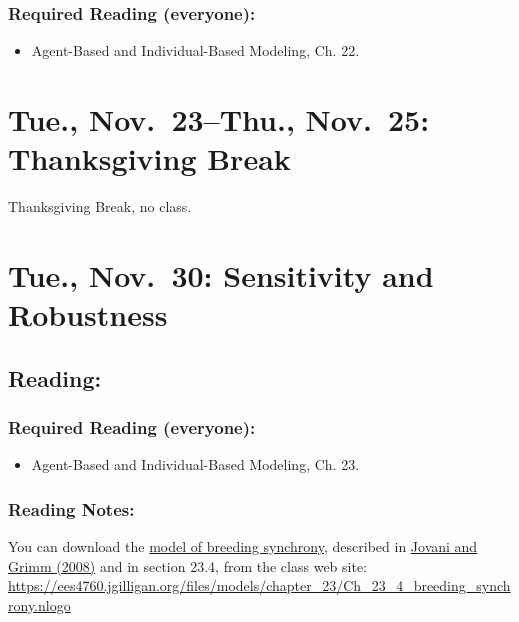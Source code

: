 \documentclass[
]{article}
\providecommand{\tightlist}{%
  \setlength{\itemsep}{0pt}\setlength{\parskip}{0pt}}
\begin{document}
\hypertarget{required-reading-everyone-20}{%
\subsubsection{Required Reading
(everyone):}\label{required-reading-everyone-20}}

\begin{itemize}
\tightlist
\item
  Agent-Based and Individual-Based Modeling, Ch. 22.
\end{itemize}

\hypertarget{tue.-nov.-23thu.-nov.-25-thanksgiving-break}{%
\section{Tue., Nov.~23--Thu., Nov.~25: Thanksgiving
Break}\label{tue.-nov.-23thu.-nov.-25-thanksgiving-break}}

Thanksgiving Break, no class.

\hypertarget{tue.-nov.-30-sensitivity-and-robustness}{%
\section{Tue., Nov.~30: Sensitivity and
Robustness}\label{tue.-nov.-30-sensitivity-and-robustness}}

\hypertarget{reading-24}{%
\subsection{Reading:}\label{reading-24}}

\hypertarget{required-reading-everyone-21}{%
\subsubsection{Required Reading
(everyone):}\label{required-reading-everyone-21}}

\begin{itemize}
\tightlist
\item
  Agent-Based and Individual-Based Modeling, Ch. 23.
\end{itemize}

\hypertarget{reading-notes-15}{%
\subsubsection{Reading Notes:}\label{reading-notes-15}}

You can download the
\href{/files/models/chapter_23/Ch_23_4_breeding_synchrony.nlogo}{model
of breeding synchrony}, described in
\href{/files/models/chapter_05/Jovani_Grimm_2008_Breeding.pdf}{Jovani
and Grimm (2008)} and in section 23.4, from the class web site:
\url{https://ees4760.jgilligan.org/files/models/chapter_23/Ch_23_4_breeding_synchrony.nlogo}
\end{document}
